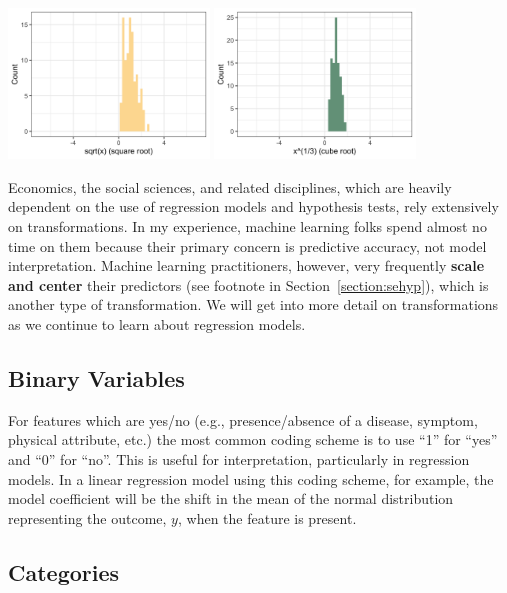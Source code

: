 \begin{question}{}
\begin{center}
\includegraphics[width=0.4\textwidth]{img/exp-transform-4.png}
\includegraphics[width=0.4\textwidth]{img/exp-transform-5.png}
\end{center}
\end{question}

Economics, the social sciences, and related disciplines, which are heavily dependent on the use of regression models and hypothesis tests, rely extensively on transformations. In my experience, machine learning folks spend almost no time on them because their primary concern is predictive accuracy, not model interpretation. Machine learning practitioners, however, very frequently \textbf{scale and center} their predictors (see footnote in Section~\ref{section:sehyp}), which is another type of transformation. We will get into more detail on transformations as we continue to learn about regression models. 

\subsection{Binary Variables}

For features which are yes/no (e.g., presence/absence of a disease, symptom, physical attribute, etc.) the most common coding scheme is to use ``1'' for ``yes'' and ``0'' for ``no''. This is useful for interpretation, particularly in regression models. In a linear regression model using this coding scheme, for example, the model coefficient will be the shift in the mean of the normal distribution representing the outcome, $y$, when the feature is present. 

\subsection{Categories}


